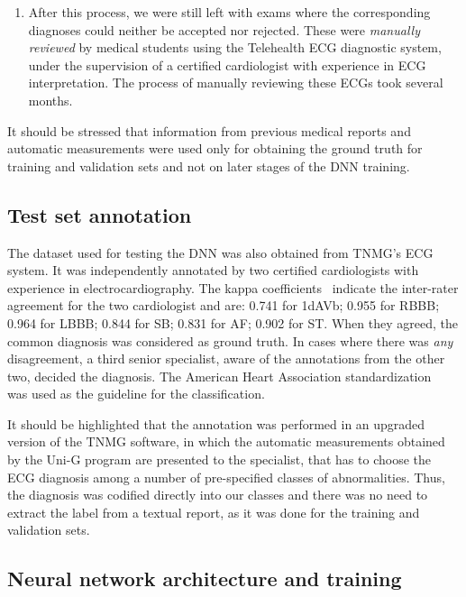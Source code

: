 \documentclass{article}
\begin{document}
\begin{enumerate}
\item After this process, we were still left with  exams where the corresponding diagnoses could neither be accepted nor rejected. These were \textit{manually reviewed} by medical students using the Telehealth ECG diagnostic system, under the supervision of a certified cardiologist with experience in ECG interpretation. The process of manually reviewing these ECGs took several months.
\end{enumerate}

It should be stressed that information from previous medical reports and automatic measurements were used only for obtaining the ground truth for training and validation sets and not on later stages of the DNN training. 

\subsection{Test set annotation}

The dataset used for testing the DNN was also obtained from TNMG's ECG system. It was independently annotated by two certified cardiologists with experience in electrocardiography. The kappa coefficients~\cite{cohen_coefficient_1960} indicate the inter-rater agreement for the two cardiologist and are: 0.741 for 1dAVb; 0.955 for RBBB; 0.964 for LBBB; 0.844 for SB; 0.831 for AF; 0.902 for ST. When they agreed, the common diagnosis was considered as ground truth. In cases where there was  \textit{any} disagreement, a third senior specialist, aware of the annotations from the other two, decided the diagnosis. The American Heart Association standardization~\cite{kligfield_recommendations_2007} was used as the guideline for the classification. 

It should be highlighted that the annotation was performed in an upgraded version of the TNMG software, in which the automatic measurements obtained by the Uni-G program are presented to the specialist, that has to choose the ECG diagnosis among a number of pre-specified classes of abnormalities. Thus, the diagnosis was codified directly into our classes and there was no need to extract the label from a textual report, as it was done for the training and validation sets.

\subsection{Neural network architecture and training}
\label{sec:Model}
\end{document}
